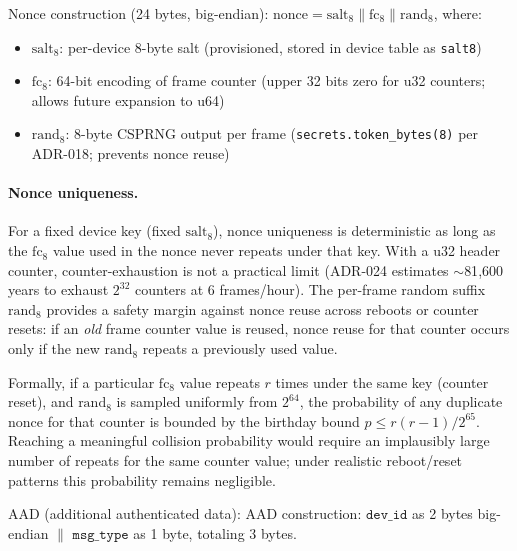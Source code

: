 Nonce construction (24 bytes, big-endian): $\text{nonce} = \text{salt}_8 \| \text{fc}_8 \| \text{rand}_8$, where:
\begin{itemize}[nosep]
    \item $\text{salt}_8$: per-device 8-byte salt (provisioned, stored in device table as \texttt{salt8})
    \item $\text{fc}_8$: 64-bit encoding of frame counter (upper 32 bits zero for u32 counters; allows future expansion to u64)
    \item $\text{rand}_8$: 8-byte \ac{CSPRNG} output per frame (\texttt{secrets.token\_bytes(8)} per \ac{ADR}-018; prevents nonce reuse)
\end{itemize}

\paragraph{Nonce uniqueness.}
For a fixed device key (fixed $\text{salt}_8$), nonce uniqueness is deterministic as long as the $\text{fc}_8$ value used in the nonce never repeats under that key.
With a u32 header counter, counter-exhaustion is not a practical limit (\ac{ADR}-024 estimates $\sim$81{,}600 years to exhaust $2^{32}$ counters at 6 frames/hour).
The per-frame random suffix $\text{rand}_8$ provides a safety margin against nonce reuse across reboots or counter resets: if an \emph{old} frame counter value is reused, nonce reuse for that counter occurs only if the new $\text{rand}_8$ repeats a previously used value.

Formally, if a particular $\text{fc}_8$ value repeats $r$ times under the same key (counter reset), and $\text{rand}_8$ is sampled uniformly from $2^{64}$, the probability of any duplicate nonce for that counter is bounded by the birthday bound $p \le r(r-1)/2^{65}$.
Reaching a meaningful collision probability would require an implausibly large number of repeats for the same counter value; under realistic reboot/reset patterns this probability remains negligible.

\ac{AAD} (additional authenticated data):
\ac{AAD} construction: $\texttt{dev\_id}$ as 2 bytes big-endian $\|$ $\texttt{msg\_type}$ as 1 byte,
totaling 3 bytes.

